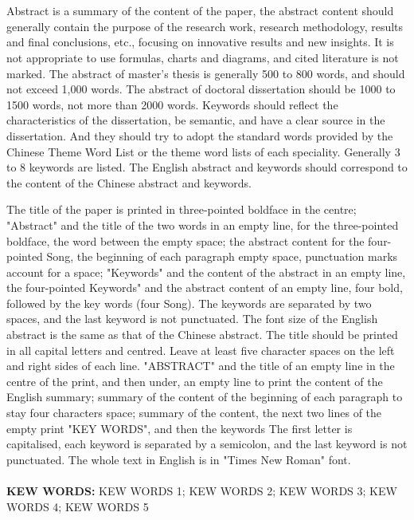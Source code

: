 \section*{\ArticleTitleEn}
\begin{enabstract}
\fontsize{14pt}{17.5pt}\selectfont %

Abstract is a summary of the content of the paper, the abstract content should generally contain the purpose of the research work, research methodology, results and final conclusions, etc., focusing on innovative results and new insights. It is not appropriate to use formulas, charts and diagrams, and cited literature is not marked. The abstract of master's thesis is generally 500 to 800 words, and should not exceed 1,000 words. The abstract of doctoral dissertation should be 1000 to 1500 words, not more than 2000 words. Keywords should reflect the characteristics of the dissertation, be semantic, and have a clear source in the dissertation. And they should try to adopt the standard words provided by the Chinese Theme Word List or the theme word lists of each speciality. Generally 3 to 8 keywords are listed. The English abstract and keywords should correspond to the content of the Chinese abstract and keywords.
\par
The title of the paper is printed in three-pointed boldface in the centre; "Abstract" and the title of the two words in an empty line, for the three-pointed boldface, the word between the empty space; the abstract content for the four-pointed Song, the beginning of each paragraph empty space, punctuation marks account for a space; "Keywords" and the content of the abstract in an empty line, the four-pointed Keywords" and the abstract content of an empty line, four bold, followed by the key words (four Song). The keywords are separated by two spaces, and the last keyword is not punctuated.
The font size of the English abstract is the same as that of the Chinese abstract. The title should be printed in all capital letters and centred. Leave at least five character spaces on the left and right sides of each line. "ABSTRACT" and the title of an empty line in the centre of the print, and then under, an empty line to print the content of the English summary; summary of the content of the beginning of each paragraph to stay four characters space; summary of the content, the next two lines of the empty print "KEY WORDS", and then the keywords The first letter is capitalised, each keyword is separated by a semicolon, and the last keyword is not punctuated. The whole text in English is in "Times New Roman" font.
\\
\\
\textbf{KEW WORDS:} KEW WORDS 1;  KEW WORDS 2;  KEW WORDS 3;  KEW WORDS 4;  KEW WORDS 5
\end{enabstract}
\pagebreak